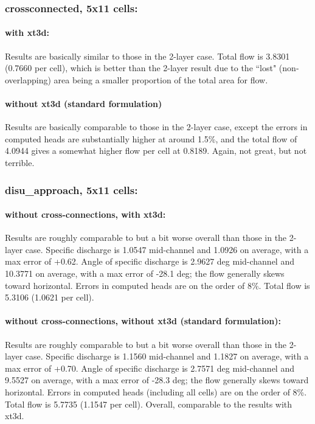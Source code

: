 \documentclass{article}
\begin{document}
\subsubsection{crossconnected, 5x11 cells:}

\paragraph{with xt3d:} Results are basically similar to those in the 2-layer case. Total flow is 3.8301 (0.7660 per cell), which is better than the 2-layer result due to the ``lost" (non-overlapping) area being a smaller proportion of the total area for flow.

\paragraph{without xt3d (standard formulation)}  Results are basically comparable to those in the 2-layer case, except the errors in computed heads are substantially higher at around 1.5\%, and the total flow of 4.0944 gives a somewhat higher flow per cell at 0.8189. Again, not great, but not terrible.

\subsubsection{disu\_approach, 5x11 cells:}

\paragraph{without cross-connections, with xt3d:} Results are roughly comparable to but a bit worse overall than those in the 2-layer case. Specific discharge is 1.0547 mid-channel and 1.0926 on average, with a max error of +0.62. Angle of specific discharge is 2.9627 deg mid-channel and 10.3771 on average, with a max error of -28.1 deg; the flow generally skews toward horizontal. Errors in computed heads are on the order of 8\%. Total flow is 5.3106 (1.0621 per cell).

\paragraph{without cross-connections, without xt3d (standard formulation):} Results are roughly comparable to but a bit worse overall than those in the 2-layer case. Specific discharge is 1.1560 mid-channel and 1.1827 on average, with a max error of +0.70. Angle of specific discharge is 2.7571 deg mid-channel and 9.5527 on average, with a max error of -28.3 deg; the flow generally skews toward horizontal. Errors in computed heads (including all cells) are on the order of 8\%. Total flow is 5.7735 (1.1547 per cell). Overall, comparable to the results with xt3d.
\end{document}
